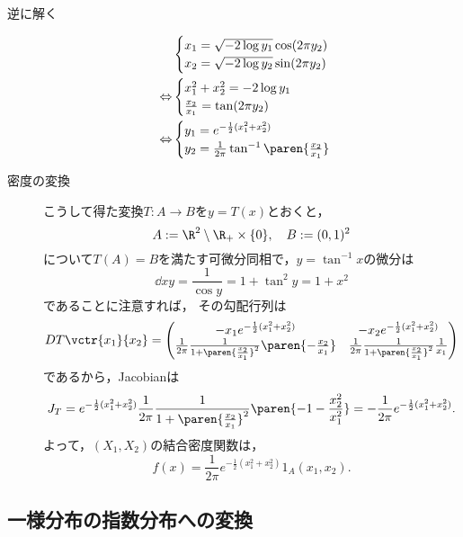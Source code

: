\documentclass[uplatex,dvipdfmx]{jsreport}
\begin{document}
\begin{Proof}\mbox{}
    \begin{description}
        \item[逆に解く] \begin{align*}
            &\begin{cases}
                x_1=\sqrt{-2\log y_1}\cos(2\pi y_2)\\
                x_2=\sqrt{-2\log y_2}\sin(2\pi y_2)
            \end{cases}\\
            \Leftrightarrow&\begin{cases}
                x_1^2+x_2^2=-2\log y_1\\
                \frac{x_2}{x_1}=\tan(2\pi y_2)
            \end{cases}\\
            \Leftrightarrow&\begin{cases}
                y_1=e^{-\frac{1}{2}(x_1^2+x_2^2)}\\
                y_2=\frac{1}{2\pi}\tan^{-1}\paren{\frac{x_2}{x_1}}
            \end{cases}
        \end{align*}
        \item[密度の変換] こうして得た変換$T:A\to B$を$y=T(x)$とおくと，
        \[A:=\R^2\setminus\R_+\times\{0\},\quad B:=(0,1)^2\]
        について$T(A)=B$を満たす可微分同相で，$y=\tan^{-1}x$の微分は
        \[\dd{x}{y}=\frac{1}{\cos y}=1+\tan^2y=1+x^2\]
        であることに注意すれば，
        その勾配行列は
        \[DT\vctr{x_1}{x_2}=\begin{pmatrix}-x_1e^{-\frac{1}{2}(x^2_1+x^2_2)}&-x_2e^{-\frac{1}{2}(x^2_1+x^2_2)}\\
        \frac{1}{2\pi}\frac{1}{1+\paren{\frac{x_2}{x_1}}^2}\paren{-\frac{x_2}{x_1}}&\frac{1}{2\pi}\frac{1}{1+\paren{\frac{x_2}{x_1}}^2}\frac{1}{x_1}\end{pmatrix}\]
        であるから，Jacobianは
        \[J_T=e^{-\frac{1}{2}(x_1^2+x_2^2)}\frac{1}{2\pi}\frac{1}{1+\paren{\frac{x_2}{x_1}}^2}\paren{-1-\frac{x_2^2}{x_1^2}}=-\frac{1}{2\pi}e^{-\frac{1}{2}(x_1^2+x_2^2)}.\]
        よって，$(X_1,X_2)$の結合密度関数は，
        \[f(x)=\frac{1}{2\pi}e^{-\frac{1}{2}(x_1^2+x_2^2)}1_A(x_1,x_2).\]
    \end{description}
\end{Proof}

\subsection{一様分布の指数分布への変換}
\end{document}
